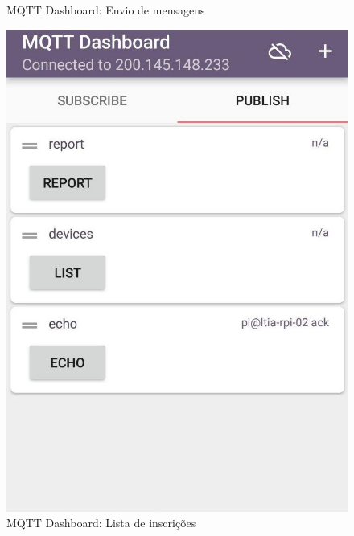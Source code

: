 \begin{figure}[htb]
\centering
	\begin{minipage}{0.32\textwidth}
	\centering
		\caption{\label{fig-ad-publish}MQTT Dashboard: Envio de mensagens}
		\includegraphics[width=1\textwidth]{052-gateway/mqtt/ad-publish.jpg}
	\end{minipage}
\hfill
	\begin{minipage}{0.32\textwidth}
	\centering
		\caption{\label{fig-ad-home-ack}MQTT Dashboard: Lista de inscrições}

\end{minipage}
\end{figure}
